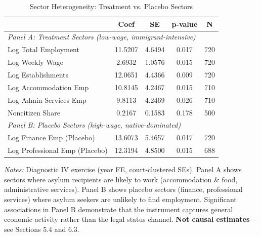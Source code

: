 \begin{table}[htbp]
\centering
\caption{Sector Heterogeneity: Treatment vs. Placebo Sectors}
\label{tab:sectors}
\begin{tabular}{lcccc}
\toprule
 & Coef & SE & p-value & N \\
\midrule
\multicolumn{5}{l}{\textit{Panel A: Treatment Sectors (low-wage, immigrant-intensive)}} \\
Log Total Employment & 11.5207 & 4.6494 & 0.017 & 720 \\
Log Weekly Wage & 2.6932 & 1.0576 & 0.015 & 720 \\
Log Establishments & 12.0651 & 4.4366 & 0.009 & 720 \\
Log Accommodation Emp & 10.8145 & 4.2467 & 0.015 & 710 \\
Log Admin Services Emp & 9.8113 & 4.2469 & 0.026 & 710 \\
Noncitizen Share & 0.2167 & 0.1583 & 0.178 & 500 \\
\midrule
\multicolumn{5}{l}{\textit{Panel B: Placebo Sectors (high-wage, native-dominated)}} \\
Log Finance Emp (Placebo) & 13.6073 & 5.4657 & 0.017 & 720 \\
Log Professional Emp (Placebo) & 12.3194 & 4.8500 & 0.015 & 688 \\
\bottomrule
\end{tabular}
\begin{minipage}{0.85\textwidth}
\vspace{0.5em}
\footnotesize \textit{Notes:} Diagnostic IV exercise (year FE, court-clustered SEs).
Panel A shows sectors where asylum recipients are likely to work (accommodation \& food,
administrative services). Panel B shows placebo sectors (finance, professional services)
where asylum seekers are unlikely to find employment. Significant associations in Panel B
demonstrate that the instrument captures general economic activity rather than the legal status channel.
\textbf{Not causal estimates}---see Sections 5.4 and 6.3.
\end{minipage}
\end{table}
